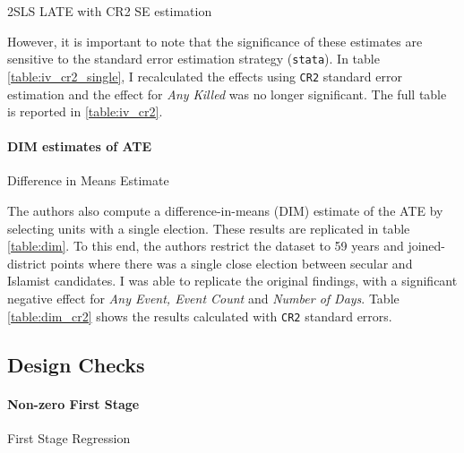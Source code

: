 \documentclass{scrartcl}
\begin{document}
\begin{table}[h!]
  \begin{center}
    \scalebox{0.75}{
      
    }
    \caption{2SLS LATE with CR2 SE estimation}
    \label{table:iv_cr2_single}
  \end{center}
\end{table}

However, it is important to note that the significance of these estimates are sensitive to the standard error estimation strategy (\texttt{stata}).
In table \ref{table:iv_cr2_single}, I recalculated the effects using \texttt{CR2} standard error estimation and the effect for \textit{Any Killed} was no longer significant. The full table is reported in \ref{table:iv_cr2}.

\paragraph{DIM estimates of ATE}

\begin{table}[h!]
  \begin{center}
    \scalebox{0.75}{
      
    }
    \caption{Difference in Means Estimate}
    \label{table:dim}
  \end{center}
\end{table}

The authors also compute a difference-in-means (DIM) estimate of the ATE by selecting units with a single election. 
These results are replicated in table \ref{table:dim}.
To this end, the authors restrict the dataset to 59 years and joined-district points where there was a single close election between secular and Islamist candidates. I was able to replicate the original findings, with a significant negative effect for \textit{Any Event, Event Count} and \textit{Number of Days}.
Table \ref{table:dim_cr2} shows the results calculated with \texttt{CR2} standard errors. 

\subsection{Design Checks}
\paragraph{Non-zero First Stage}

\begin{table}[ht]
  \begin{center}
    \scalebox{0.85}{
      
    }
    \caption{First Stage Regression}
    \label{table:first_stage}
  \end{center}
\end{table}
\end{document}
